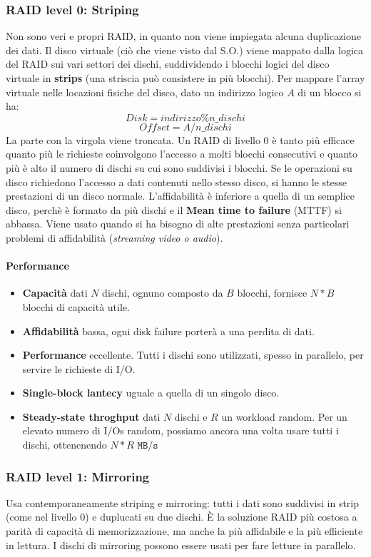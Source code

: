 \documentclass[12pt, twoside, letterpaper]{article}
\begin{document}
			\subsubsection{RAID level 0: Striping}
				Non sono veri e propri RAID, in quanto non viene impiegata alcuna duplicazione dei dati. Il disco virtuale (ciò che viene visto dal S.O.) viene mappato dalla logica del RAID sui vari settori dei dischi, suddividendo i blocchi logici del disco virtuale in \textbf{strips} (una striscia può consistere in più blocchi). Per mappare l'array virtuale nelle locazioni fisiche del disco, dato un indirizzo logico $A$ di un blocco si ha:
				$$Disk = indirizzo \% n\_dischi$$ 
				$$Offset = A / n\_dischi $$
				La parte con la virgola viene troncata. Un RAID di livello 0 è tanto più efficace quanto più le richieste coinvolgono l'accesso a molti blocchi consecutivi e quanto più è alto il numero di dischi su cui sono suddivisi i blocchi. Se le operazioni su disco richiedono l'accesso a dati contenuti nello stesso disco, si hanno le stesse prestazioni di un disco normale. L'affidabilità è inferiore a quella di un semplice disco, perchè è formato da più dischi e il \textbf{Mean time to failure} (MTTF) si abbassa. Viene usato quando si ha bisogno di alte prestazioni senza particolari problemi di affidabilità (\textit{streaming video o audio}).
				
				\paragraph{Performance}
					\begin{itemize}
						\item \textbf{Capacità} dati $N$ dischi, ognuno composto da $B$ blocchi, fornisce $N * B$ blocchi di capacità utile.
						\item \textbf{Affidabilità} bassa, ogni disk failure porterà a una perdita di dati.
						\item \textbf{Performance} eccellente. Tutti i dischi sono utilizzati, spesso in parallelo, per servire le richieste di I/O.
						\item \textbf{Single-block lantecy} uguale a quella di un singolo disco.
						\item \textbf{Steady-state throghput} dati $N$ dischi e $R$ un workload random. Per un elevato numero di I/Os random, possiamo ancora una volta usare tutti i dischi, ottenenendo $N * R \texttt{ MB/s}$ 
					\end{itemize}
					
			\subsubsection{RAID level 1: Mirroring}
				Usa contemporaneamente striping e mirroring: tutti i dati sono suddivisi in strip (come nel livello 0) e duplucati su due dischi. È la soluzione RAID più costosa a parità di capacità di memorizzazione, ma anche la più affidabile e la più efficiente in lettura. I dischi di mirroring possono essere usati per fare letture in parallelo. 
				
\end{document}
